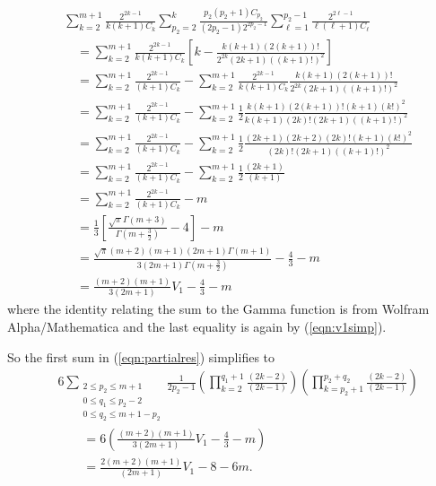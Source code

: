 \documentclass[11pt]{article}
\theoremstyle{definition}
\theoremstyle{definition}
\theoremstyle{plain}
\theoremstyle{plain}
\theoremstyle{plain}
\theoremstyle{definition}
\theoremstyle{definition}
\begin{document}
{\begin{equation}\label{eqn:firstsimplified}
\begin{aligned}
&\sum\limits_{k=2}^{m+1}\frac{2^{2k-1}}{k(k+1)C_k}\sum\limits_{p_2=2}^k\frac{p_2(p_2+1)C_{p_2}}{(2p_2-1)2^{2p_2-1}}\sum\limits_{\ell=1}^{p_2-1}\frac{2^{2\ell-1}}{\ell(\ell+1)C_\ell} \\
&\quad= \sum\limits_{k=2}^{m+1}\frac{2^{2k-1}}{k(k+1)C_k}\left[k - \frac{k(k+1)(2(k+1))!}{2^{2k}(2k+1)((k+1)!)^2}\right] \\
&\quad = \sum\limits_{k=2}^{m+1}\frac{2^{2k-1}}{(k+1)C_k} - \sum\limits_{k=2}^{m+1}\frac{2^{2k-1}}{k(k+1)C_k}\frac{k(k+1)(2(k+1))!}{2^{2k}(2k+1)((k+1)!)^2} \\
&\quad = \sum\limits_{k=2}^{m+1}\frac{2^{2k-1}}{(k+1)C_k} - \sum\limits_{k=2}^{m+1}\frac{1}{2}\frac{k(k+1)(2(k+1))!(k+1)(k!)^2}{k(k+1)(2k)!(2k+1)((k+1)!)^2} \\
&\quad = \sum\limits_{k=2}^{m+1}\frac{2^{2k-1}}{(k+1)C_k} - \sum\limits_{k=2}^{m+1}\frac{1}{2}\frac{(2k+1)(2k+2)(2k)!(k+1)(k!)^2}{(2k)!(2k+1)((k+1)!)^2} \\
&\quad = \sum\limits_{k=2}^{m+1}\frac{2^{2k-1}}{(k+1)C_k} - \sum\limits_{k=2}^{m+1}\frac{1}{2}\frac{(2k+1)}{(k+1)} \\
&\quad = \sum\limits_{k=2}^{m+1}\frac{2^{2k-1}}{(k+1)C_k} - m \\
&\quad = \frac{1}{3}\left[\frac{\sqrt{\pi}\Gamma(m+3)}{\Gamma\left(m+\frac{3}{2}\right)}-4\right] - m \\
&\quad = \frac{\sqrt{\pi}(m+2)(m+1)(2m+1)\Gamma(m+1)}{3(2m+1)\Gamma\left(m+\frac{3}{2}\right)} - \frac{4}{3} - m \\
&\quad = \frac{(m+2)(m+1)}{3(2m+1)}V_1-\frac{4}{3}-m
\end{aligned}
\end{equation}
where the identity relating the sum to the Gamma function is from Wolfram Alpha/Mathematica and the last equality is again by (\ref{eqn:v1simp}).

So the first sum in (\ref{eqn:partialres}) simplifies to
\begin{equation}\label{eqn:firstsimp2}
\begin{aligned}
&6\sum\limits_{\substack{2\leq p_2\leq m+1 \\ 0\leq q_1 \leq p_2-2 \\ 0\leq q_2 \leq m+1-p_2}}\frac{1}{2p_2-1}\left(\prod\limits_{k=2}^{q_1+1}\frac{(2k-2)}{(2k-1)}\right)\left(\prod\limits_{k=p_2+1}^{p_2+q_2}\frac{(2k-2)}{(2k-1)}\right) \\
&\qquad = 6\left(\frac{(m+2)(m+1)}{3(2m+1)}V_1-\frac{4}{3}-m\right) \\
&\qquad = \frac{2(m+2)(m+1)}{(2m+1)}V_1-8-6m.
\end{aligned}
\end{equation}

}
\end{document}
